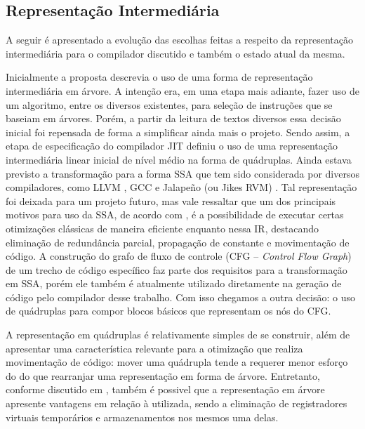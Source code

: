 \subsection{Representação Intermediária}
A seguir é apresentado a evolução das escolhas feitas a respeito da
representação intermediária para o compilador discutido e também o
estado atual da mesma.

Inicialmente a proposta descrevia o uso de uma forma de representação
intermediária em árvore. A intenção era, em uma etapa mais adiante,
fazer uso de um algoritmo, entre os diversos existentes, para seleção
de instruções que se baseiam em árvores. %
Porém, a partir da leitura de
textos diversos essa decisão inicial foi repensada de forma a
simplificar ainda mais o projeto.
Sendo assim, a etapa de especificação do compilador JIT
definiu o uso de uma representação intermediária linear inicial de nível
médio na forma de
quádruplas. Ainda estava previsto a transformação para a forma SSA que
tem sido considerada por diversos compiladores, como LLVM
\cite{llvm1}, GCC \cite{gcc-ssa} e Jalapeño (ou Jikes RVM)
\cite{jalapeno_1}. Tal representação foi deixada para um projeto futuro,
mas vale ressaltar que um dos principais motivos para uso da SSA, de
acordo com , é a possibilidade de executar certas
otimizações clássicas de maneira eficiente
enquanto nessa IR, destacando eliminação de redundância parcial,
propagação de constante e movimentação de código.
A construção do grafo de fluxo de controle (CFG
-- \textit{Control Flow Graph}) de um trecho de código específico faz
parte dos requisitos para a transformação em SSA, porém ele também é
atualmente utilizado diretamente na geração de código pelo compilador
desse trabalho. Com isso
chegamos a outra decisão: o uso de quádruplas para compor blocos
básicos que representam os nós do CFG.

A representação em quádruplas é relativamente simples de se construir,
além de apresentar uma característica relevante para a otimização que
realiza movimentação de código: mover uma quádrupla tende a requerer
menor esforço do do que rearranjar uma representação em forma de
árvore. Entretanto, conforme discutido em ,
também é possivel que a representação em árvore apresente vantagens
em relação à utilizada, sendo a eliminação de registradores virtuais
temporários e armazenamentos nos mesmos uma delas.

